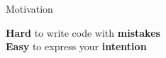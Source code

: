 \begin{frame}{Motivation}%
	\Large%
	\raggedright\textbf{Hard} to write code with \textbf{mistakes}\\[2cm]
	\pause%
	\raggedleft\textbf{Easy} to express your \textbf{intention}%
\end{frame}%
